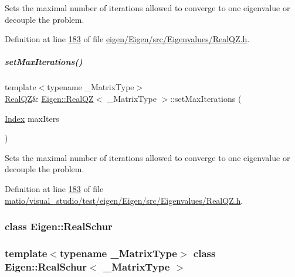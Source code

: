 Sets the maximal number of iterations allowed to converge to one eigenvalue or decouple the problem. 

Definition at line \hyperlink{eigen_2_eigen_2src_2_eigenvalues_2_real_q_z_8h_source_l00183}{183} of file \hyperlink{eigen_2_eigen_2src_2_eigenvalues_2_real_q_z_8h_source}{eigen/\+Eigen/src/\+Eigenvalues/\+Real\+Q\+Z.\+h}.

\mbox{\label{group___eigenvalues___module_a30ae65666b1757e4a2b6a28eaec12226}} 
\subparagraph{\texorpdfstring{set\+Max\+Iterations()}{setMaxIterations()}\hspace{0.1cm}{\footnotesize\ttfamily [2/2]}}
{\footnotesize\ttfamily template$<$typename \+\_\+\+Matrix\+Type$>$ \\
\hyperlink{group___eigenvalues___module_class_eigen_1_1_real_q_z}{Real\+QZ}\& \hyperlink{group___eigenvalues___module_class_eigen_1_1_real_q_z}{Eigen\+::\+Real\+QZ}$<$ \+\_\+\+Matrix\+Type $>$\+::set\+Max\+Iterations (\begin{DoxyParamCaption}\item[{\hyperlink{group___eigenvalues___module_a6201e534e901b5f4e66f72c176b534a3}{Index}}]{max\+Iters }\end{DoxyParamCaption})\hspace{0.3cm}{\ttfamily [inline]}}

Sets the maximal number of iterations allowed to converge to one eigenvalue or decouple the problem. 

Definition at line \hyperlink{matio_2visual__studio_2test_2eigen_2_eigen_2src_2_eigenvalues_2_real_q_z_8h_source_l00183}{183} of file \hyperlink{matio_2visual__studio_2test_2eigen_2_eigen_2src_2_eigenvalues_2_real_q_z_8h_source}{matio/visual\+\_\+studio/test/eigen/\+Eigen/src/\+Eigenvalues/\+Real\+Q\+Z.\+h}.

\label{class_eigen_1_1_real_schur}
\subsubsection{class Eigen\+:\+:Real\+Schur}
\subsubsection*{template$<$typename \+\_\+\+Matrix\+Type$>$\newline
class Eigen\+::\+Real\+Schur$<$ \+\_\+\+Matrix\+Type $>$}

